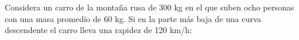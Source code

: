 Considera un carro de la montaña rusa de 300 kg en el que suben ocho
personas con una masa promedio de 60 kg. Si en la parte más baja de
una curva descendente el carro lleva una rapidez de 120 km/h:

\begin{parts}
    
    
    
\end{parts}
